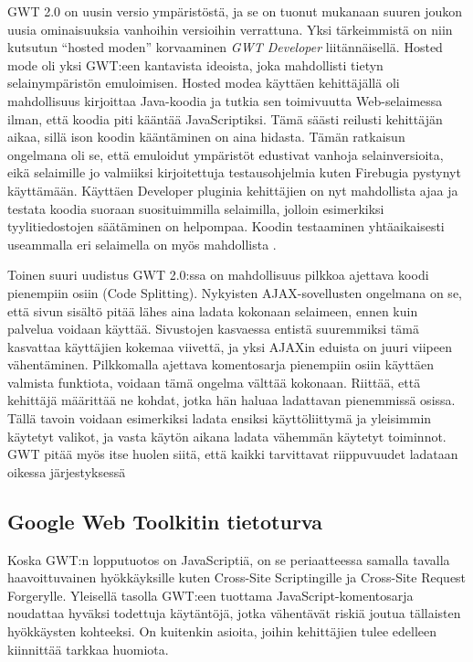 GWT 2.0 on uusin versio ympäristöstä, ja se on tuonut mukanaan suuren joukon uusia ominaisuuksia vanhoihin versioihin verrattuna. Yksi tärkeimmistä on niin kutsutun ``hosted moden'' 
korvaaminen \emph{GWT Developer} liitännäisellä. Hosted mode oli yksi GWT:een kantavista ideoista, joka mahdollisti tietyn selainympäristön emuloimisen. Hosted modea käyttäen 
kehittäjällä oli mahdollisuus kirjoittaa Java-koodia ja tutkia sen toimivuutta Web-selaimessa ilman, että koodia piti kääntää JavaScriptiksi. Tämä säästi reilusti kehittäjän aikaa, sillä 
ison koodin kääntäminen on aina hidasta. Tämän ratkaisun ongelmana oli se, että emuloidut ympäristöt edustivat vanhoja selainversioita, eikä selaimille jo valmiiksi kirjoitettuja 
testausohjelmia kuten Firebugia pystynyt käyttämään. Käyttäen Developer pluginia kehittäjien on nyt mahdollista ajaa ja testata koodia suoraan suosituimmilla selaimilla, jolloin esimerkiksi
tyylitiedostojen säätäminen on helpompaa. Koodin testaaminen yhtäaikaisesti useammalla eri selaimella on myös mahdollista \cite{GWTnew}. 

Toinen suuri uudistus GWT 2.0:ssa on mahdollisuus pilkkoa ajettava koodi pienempiin osiin (Code Splitting). Nykyisten AJAX-sovellusten ongelmana on se, että sivun sisältö pitää lähes aina 
ladata kokonaan selaimeen, ennen kuin palvelua voidaan käyttää. Sivustojen kasvaessa entistä suuremmiksi tämä kasvattaa käyttäjien kokemaa viivettä, ja yksi AJAXin eduista on juuri
viipeen vähentäminen. Pilkkomalla ajettava komentosarja pienempiin osiin käyttäen valmista funktiota, voidaan tämä ongelma välttää kokonaan. Riittää, että kehittäjä määrittää ne kohdat, 
jotka hän haluaa ladattavan pienemmissä osissa. Tällä tavoin voidaan esimerkiksi ladata ensiksi käyttöliittymä ja yleisimmin käytetyt valikot, ja vasta käytön aikana ladata vähemmän 
käytetyt toiminnot. GWT pitää myös itse huolen siitä, että kaikki tarvittavat riippuvuudet ladataan oikessa järjestyksessä \cite{GWTnew}

\subsection{Google Web Toolkitin tietoturva}

Koska GWT:n lopputuotos on JavaScriptiä, on se periaatteessa samalla tavalla haavoittuvainen hyökkäyksille kuten Cross-Site Scriptingille ja Cross-Site Request Forgerylle. Yleisellä tasolla 
GWT:een tuottama JavaScript-komentosarja noudattaa hyväksi todettuja käytäntöjä, jotka vähentävät riskiä joutua tällaisten hyökkäysten kohteeksi. On kuitenkin asioita, joihin kehittäjien tulee edelleen
kiinnittää tarkkaa huomiota. 

